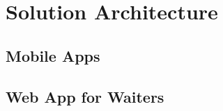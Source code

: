 
\section{Solution Architecture}
\label{sec:solution_architecture}

\subsection{Mobile Apps}
\label{sub:mobile_apps}

\subsection{Web App for Waiters}
\label{sub:web_app_for_waiters}
